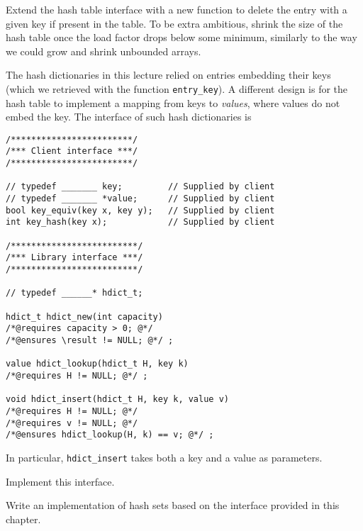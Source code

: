 
\begin{exercise}
  Extend the hash table interface with a new function to delete the
  entry with a given key if present in the table.  To be extra
  ambitious, shrink the size of the hash table once the load factor
  drops below some minimum, similarly to the way we could grow and
  shrink unbounded arrays.
\end{exercise}

\begin{exercise}
  The hash dictionaries in this lecture relied on entries embedding
  their keys (which we retrieved with the function
  \lstinline'entry_key').  A different design is for the hash table to
  implement a mapping from keys to \emph{values}, where values do not
  embed the key.  The interface of such hash dictionaries is
\begin{lstlisting}[language={[C0]C}]
/************************/
/*** Client interface ***/
/************************/

// typedef _______ key;         // Supplied by client
// typedef _______ *value;      // Supplied by client
bool key_equiv(key x, key y);   // Supplied by client
int key_hash(key x);            // Supplied by client

/*************************/
/*** Library interface ***/
/*************************/

// typedef ______* hdict_t;

hdict_t hdict_new(int capacity)
/*@requires capacity > 0; @*/
/*@ensures \result != NULL; @*/ ;

value hdict_lookup(hdict_t H, key k)
/*@requires H != NULL; @*/ ;

void hdict_insert(hdict_t H, key k, value v)
/*@requires H != NULL; @*/
/*@requires v != NULL; @*/
/*@ensures hdict_lookup(H, k) == v; @*/ ;
\end{lstlisting}
  In particular, \lstinline'hdict_insert' takes both a key and a value
  as parameters.

  Implement this interface.
\end{exercise}

\begin{exercise}
  Write an implementation of hash sets based on the interface provided
  in this chapter.
\end{exercise}


\printsolutions
% 
% 

